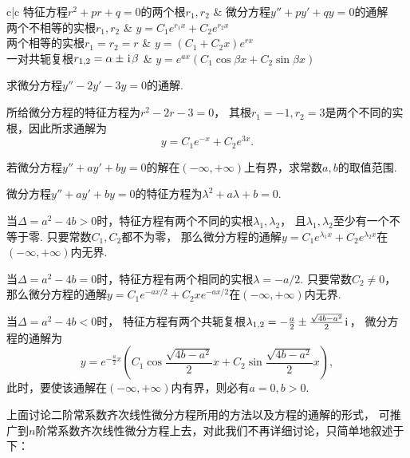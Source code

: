 \begin{table}[htb]
	\centering
	\begin{tblr}{c|c}
		\hline
		特征方程\(r^2+pr+q=0\)的两个根\(r_1,r_2\)
			& 微分方程\(y''+py'+qy = 0\)的通解 \\ \hline
		两个不相等的实根\(r_1,r_2\)
			& \(y = C_1 e^{r_1 x} + C_2 e^{r_2 x}\) \\
		两个相等的实根\(r_1=r_2=r\)
			& \(y = (C_1 + C_2 x) e^{r x}\) \\
		一对共轭复根\(r_{1,2}=\alpha\pm\kern1pt\mathrm{i}\kern1pt\beta\)
			& \(y = e^{ax} (C_1 \cos{\beta x} + C_2 \sin{\beta x})\) \\ \hline
	\end{tblr}
	\caption{}
	\label{table:二阶常系数齐次线性微分方程.通解}
\end{table}

\begin{example}
求微分方程\(y'' - 2y' - 3y = 0\)的通解.
\begin{solution}
所给微分方程的特征方程为\(r^2-2r-3=0\)，
其根\(r_1=-1, r_2=3\)是两个不同的实根，因此所求通解为\[
	y = C_1 e^{-x} + C_2 e^{3x}.
\]
\end{solution}
\end{example}

\begin{example}
若微分方程\(y''+ay'+by=0\)的解在\((-\infty,+\infty)\)上有界，求常数\(a,b\)的取值范围.
\begin{solution}
微分方程\(y''+ay'+by=0\)的特征方程为\(\lambda^2 + a\lambda+b = 0\).

当\(\Delta=a^2-4b>0\)时，特征方程有两个不同的实根\(\lambda_1,\lambda_2\)，
且\(\lambda_1,\lambda_2\)至少有一个不等于零.
只要常数\(C_1,C_2\)都不为零，
那么微分方程的通解\(y = C_1 e^{\lambda_1 x} + C_2 e^{\lambda_2 x}\)在\((-\infty,+\infty)\)内无界.

当\(\Delta=a^2-4b=0\)时，特征方程有两个相同的实根\(\lambda=-a/2\).
只要常数\(C_2\neq0\)，
那么微分方程的通解\(y = C_1 e^{-ax/2} + C_2 x e^{-ax/2}\)在\((-\infty,+\infty)\)内无界.

当\(\Delta=a^2-4b<0\)时，
特征方程有两个共轭复根\(\lambda_{1,2}=-\frac{a}{2}\pm\frac{\sqrt{4b-a^2}}{2}\kern1pt\mathrm{i}\kern1pt\)，
微分方程的通解为\[
	y = e^{-\frac{a}{2}x} \left( C_1 \cos\frac{\sqrt{4b-a^2}}{2}x + C_2 \sin\frac{\sqrt{4b-a^2}}{2}x \right),
\]
此时，要使该通解在\((-\infty,+\infty)\)内有界，则必有\(a = 0, b > 0\).
\end{solution}
\end{example}

上面讨论二阶常系数齐次线性微分方程所用的方法以及方程的通解的形式，
可推广到\(n\)阶常系数齐次线性微分方程上去，对此我们不再详细讨论，只简单地叙述于下：

